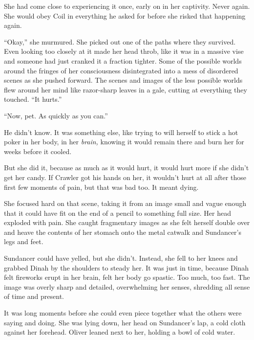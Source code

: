 She had come close to experiencing it once, early on in her captivity.  Never again.  She would obey Coil in everything he asked for before she risked that happening again.



``Okay,'' she murmured.  She picked out one of the paths where they survived.  Even looking too closely at it made her head throb, like it was in a massive vise and someone had just cranked it a fraction tighter.  Some of the possible worlds around the fringes of her consciousness disintegrated into a mess of disordered scenes as she pushed forward.  The scenes and images of the less possible worlds flew around her mind like razor-sharp leaves in a gale, cutting at everything they touched.  ``It hurts.''



``Now, pet.  As quickly as you can.''



He didn't know.  It was something else, like trying to will herself to stick a hot poker in her body, in her \emph{brain,} knowing it would remain there and burn her for weeks before it cooled.



But she did it, because as much as it would hurt, it would hurt more if she didn't get her candy.  If Crawler got his hands on her, it wouldn't hurt at all after those first few moments of pain, but that was bad too.  It meant dying.



She focused hard on that scene, taking it from an image small and vague enough that it could have fit on the end of a pencil to something full size.  Her head exploded with pain.  She caught fragmentary images as she felt herself double over and heave the contents of her stomach onto the metal catwalk and Sundancer's legs and feet.



Sundancer could have yelled, but she didn't.  Instead, she fell to her knees and grabbed Dinah by the shoulders to steady her.  It was just in time, because Dinah felt fireworks erupt in her brain, felt her body go spastic.  Too much, too fast.  The image was overly sharp and detailed, overwhelming her senses, shredding all sense of time and present.



It was long moments before she could even piece together what the others were saying and doing.  She was lying down, her head on Sundancer's lap, a cold cloth against her forehead.  Oliver leaned next to her, holding a bowl of cold water.



